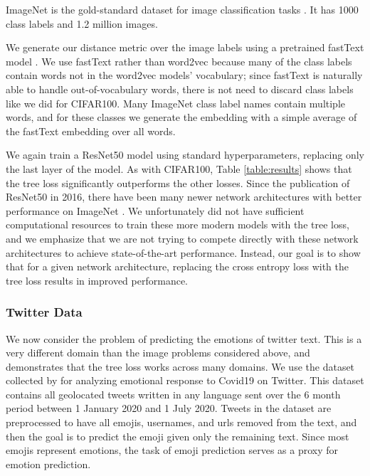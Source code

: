 \documentclass[twoside]{article}
\begin{document}
ImageNet is the gold-standard dataset for image classification tasks \citep{Russakovsky2015ImageNetLS}.
It has 1000 class labels and 1.2 million images.

We generate our distance metric over the image labels using a pretrained fastText model \citep{bojanowski2017enriching}.
We use fastText rather than word2vec because many of the class labels contain words not in the word2vec models' vocabulary;
since fastText is naturally able to handle out-of-vocabulary words,
there is not need to discard class labels like we did for CIFAR100.
Many ImageNet class label names contain multiple words,
and for these classes we generate the embedding with a simple average of the fastText embedding over all words.

We again train a ResNet50 model \citep{He2016DeepRL} using standard hyperparameters, replacing only the last layer of the model.
As with CIFAR100, Table \ref{table:results} shows that the tree loss significantly outperforms the other losses.
Since the publication of ResNet50 in 2016,
there have been many newer network architectures with better performance on ImageNet \citep[e.g.][]{howard2017mobilenets,huang2017densely,pmlr-v97-tan19a}.
We unfortunately did not have sufficient computational resources to train these more modern models with the tree loss,
and we emphasize that we are not trying to compete directly with these network architectures to achieve state-of-the-art performance.
Instead, our goal is to show that for a given network architecture,
replacing the cross entropy loss with the tree loss results in improved performance.

\subsubsection{Twitter Data}

We now consider the problem of predicting the emotions of twitter text.
This is a very different domain than the image problems considered above,
and demonstrates that the tree loss works across many domains.
We use the dataset collected by \citep{stoikos2020multilingual} for analyzing emotional response to Covid19 on Twitter.
This dataset contains all geolocated tweets written in any language sent over the 6 month period between 1 January 2020 and 1 July 2020.
Tweets in the dataset are preprocessed to have all emojis, usernames, and urls removed from the text,
and then the goal is to predict the emoji given only the remaining text.
Since most emojis represent emotions,
the task of emoji prediction serves as a proxy for emotion prediction.
\end{document}
